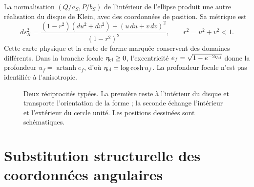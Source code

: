 La normalisation \((Q/a_S,P/b_S)\) de l’intérieur de l’ellipse produit une autre réalisation du disque de Klein, avec des coordonnées de position. Sa métrique est
\[
 ds_K^2=\frac{(1-r^2)(du^2+dv^2)+(u\,du+v\,dv)^2}{(1-r^2)^2},
 \qquad r^2=u^2+v^2<1.
\]
Cette carte physique et la carte de forme marquée conservent des domaines différents. Dans la branche focale \(\eta_{\rm el}\ge0\), l'excentricité \(e_f=\sqrt{1-e^{-2\eta_{\rm el}}}\) donne la profondeur \(u_f=\operatorname{artanh}e_f\), d'où \(\eta_{\rm el}=\log\cosh u_f\). La profondeur focale n'est pas identifiée à l'anisotropie.

\begin{figure}[htbp]
\centering
{}
\caption{Deux réciprocités typées. La première reste à l’intérieur du disque et transporte l’orientation de la forme ; la seconde échange l’intérieur et l’extérieur du cercle unité. Les positions dessinées sont schématiques.}
\label{x_reciprocidad:fig:rec-dos-cartas}
\end{figure}

\section{Substitution structurelle des coordonnées angulaires}
\label{x_reciprocidad:rec:sustitucion}

